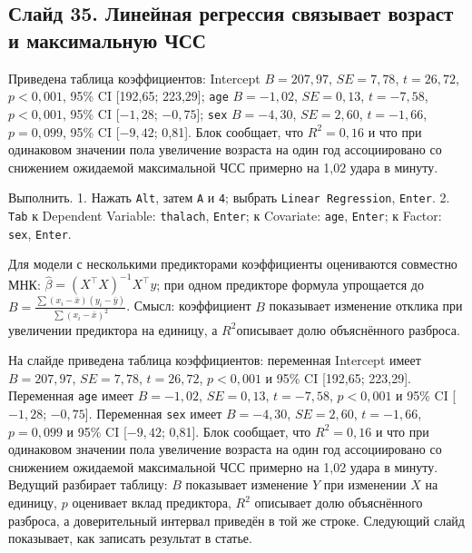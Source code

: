 \documentclass[11pt,a4paper]{article}
\begin{document}
\subsection*{Слайд 35. Линейная регрессия связывает возраст и максимальную ЧСС}
\begin{onslide}
Приведена таблица коэффициентов: Intercept $B = 207{,}97$, $SE = 7{,}78$, $t = 26{,}72$, $p < 0{,}001$, 95\% CI [192,65; 223,29]; \texttt{age} $B = -1{,}02$, $SE = 0{,}13$, $t = -7{,}58$, $p < 0{,}001$, 95\% CI [$-1{,}28$; $-0{,}75$]; \texttt{sex} $B = -4{,}30$, $SE = 2{,}60$, $t = -1{,}66$, $p = 0{,}099$, 95\% CI [$-9{,}42$; 0,81]. Блок сообщает, что $R^2 = 0{,}16$ и что при одинаковом значении пола увеличение возраста на один год ассоциировано со снижением ожидаемой максимальной ЧСС примерно на 1,02 удара в минуту.
\end{onslide}
\begin{jamovi}
Выполнить. 1. Нажать \texttt{Alt}, затем \texttt{A} и \texttt{4}; выбрать \texttt{Linear Regression}, \texttt{Enter}. 2. \texttt{Tab} к Dependent Variable: \texttt{thalach}, \texttt{Enter}; к Covariate: \texttt{age}, \texttt{Enter}; к Factor: \texttt{sex}, \texttt{Enter}.
\par Для модели с несколькими предикторами коэффициенты оцениваются совместно МНК: $\hat\beta=(X^\top X)^{-1}X^\top y$; при одном предикторе формула упрощается до $B=\frac{\sum(x_i-\bar{x})(y_i-\bar{y})}{\sum(x_i-\bar{x})^2}$. Смысл: коэффициент $B$ показывает изменение отклика при увеличении предиктора на единицу, а $R^2$описывает долю объяснённого разброса.
\end{jamovi}
На слайде приведена таблица коэффициентов: переменная Intercept имеет $B = 207{,}97$, $SE = 7{,}78$, $t = 26{,}72$, $p < 0{,}001$ и 95\% CI [192,65; 223,29]. Переменная \texttt{age} имеет $B = -1{,}02$, $SE = 0{,}13$, $t = -7{,}58$, $p < 0{,}001$ и 95\% CI [$-1{,}28$; $-0{,}75$]. Переменная \texttt{sex} имеет $B = -4{,}30$, $SE = 2{,}60$, $t = -1{,}66$, $p = 0{,}099$ и 95\% CI [$-9{,}42$; 0,81]. Блок сообщает, что $R^2 = 0{,}16$ и что при одинаковом значении пола увеличение возраста на один год ассоциировано со снижением ожидаемой максимальной ЧСС примерно на 1,02 удара в минуту. Ведущий разбирает таблицу: $B$ показывает изменение $Y$ при изменении $X$ на единицу, $p$ оценивает вклад предиктора, $R^2$ описывает долю объяснённого разброса, а доверительный интервал приведён в той же строке. Следующий слайд показывает, как записать результат в статье.
\end{document}
